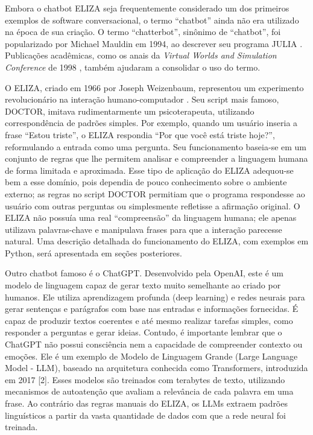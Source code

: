 \documentclass[a4paper,oneside]{book}
\begin{document}
Embora o chatbot ELIZA \cite{Weizenbaum1996} seja frequentemente considerado um dos primeiros exemplos de software conversacional, o termo ``chatbot'' ainda não era utilizado na época de sua criação. O termo ``chatterbot'', sinônimo de ``chatbot'', foi popularizado por Michael Mauldin em 1994, ao descrever seu programa JULIA \cite{Mauldin1994}. Publicações acadêmicas, como os anais da \textit{Virtual Worlds and Simulation Conference} de 1998 \cite{Jacobstein1998}, também ajudaram a consolidar o uso do termo.

O ELIZA, criado em 1966 por Joseph Weizenbaum,  representou um experimento revolucionário na interação humano-computador \cite{Weizenbaum1996}. Seu script mais famoso, DOCTOR, imitava rudimentarmente um psicoterapeuta, utilizando correspondência de padrões simples. Por exemplo, quando um usuário inseria a frase “Estou triste”, o ELIZA respondia “Por que você está triste hoje?”, reformulando a entrada como uma pergunta. Seu funcionamento baseia-se em um conjunto de regras que lhe permitem analisar e compreender a linguagem humana de forma limitada e aproximada. Esse tipo de aplicação do ELIZA adequou-se bem a esse domínio, pois dependia de pouco conhecimento sobre o ambiente externo; as regras no script DOCTOR permitiam que o programa respondesse ao usuário com outras perguntas ou simplesmente refletisse a afirmação original. O ELIZA não possuía uma real ``compreensão'' da linguagem humana; ele apenas utilizava palavras-chave e manipulava frases para que a interação parecesse natural. Uma descrição detalhada do funcionamento do ELIZA, com exemplos em Python, será apresentada em seções posteriores.

Outro chatbot famoso é o ChatGPT. Desenvolvido pela OpenAI, este é um modelo de linguagem capaz de gerar texto muito semelhante ao criado por humanos. Ele utiliza aprendizagem profunda (deep learning) e redes neurais para gerar sentenças e parágrafos com base nas entradas e informações fornecidas. É capaz de produzir textos coerentes e até mesmo realizar tarefas simples, como responder a perguntas e gerar ideias. Contudo, é importante lembrar que o ChatGPT não possui consciência nem a capacidade de compreender contexto ou emoções. Ele é um exemplo de Modelo de Linguagem Grande (Large Language Model - LLM), baseado na arquitetura conhecida como Transformers, introduzida em 2017 [2]. Esses modelos são treinados com terabytes de texto, utilizando mecanismos de autoatenção que avaliam a relevância de cada palavra em uma frase. Ao contrário das regras manuais do ELIZA, os LLMs extraem padrões linguísticos a partir da vasta quantidade de dados com que a rede neural foi treinada.
\end{document}

